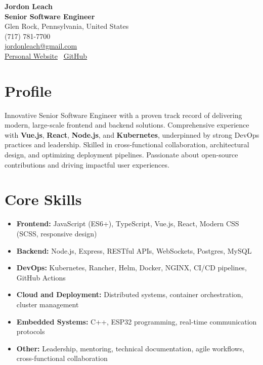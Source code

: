 \documentclass[a4paper,10pt]{article}
\begin{document}
\begin{center}
    \textbf{\Huge Jordon Leach} \\
    \vspace{2mm}
    \textbf{Senior Software Engineer} \\
    \vspace{2mm}
    Glen Rock, Pennsylvania, United States \\
    (717) 781-7700 \\
    \href{mailto:jordonleach@gmail.com}{jordonleach@gmail.com} \\
    \href{https://jordonleach.dev}{\underline{Personal Website}} \textbar\ 
    \href{https://github.com/jordojordo}{\underline{GitHub}}
\end{center}

\vspace{5mm}

\section*{Profile}
Innovative Senior Software Engineer with a proven track record of delivering modern, large-scale frontend and backend solutions. Comprehensive experience with \textbf{Vue.js}, \textbf{React}, \textbf{Node.js}, and \textbf{Kubernetes}, underpinned by strong DevOps practices and leadership. Skilled in cross-functional collaboration, architectural design, and optimizing deployment pipelines. Passionate about open-source contributions and driving impactful user experiences.

\section*{Core Skills}
\begin{itemize}[leftmargin=1.5em]
    \item \textbf{Frontend:} JavaScript (ES6+), TypeScript, Vue.js, React, Modern CSS (SCSS, responsive design)
    \item \textbf{Backend:} Node.js, Express, RESTful APIs, WebSockets, Postgres, MySQL
    \item \textbf{DevOps:} Kubernetes, Rancher, Helm, Docker, NGINX, CI/CD pipelines, GitHub Actions
    \item \textbf{Cloud and Deployment:} Distributed systems, container orchestration, cluster management
    \item \textbf{Embedded Systems:} C++, ESP32 programming, real-time communication protocols
    \item \textbf{Other:} Leadership, mentoring, technical documentation, agile workflows, cross-functional collaboration
\end{itemize}
\end{document}
